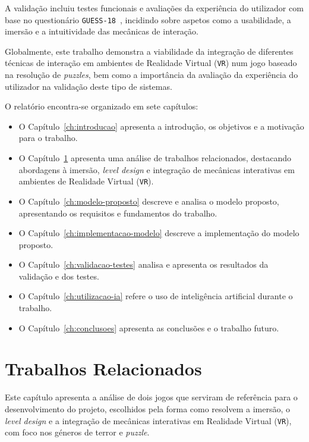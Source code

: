 \documentclass[a4paper, 12pt]{book}
\begin{document}
\par
A validação incluiu testes funcionais e avaliações da experiência do utilizador com base 
no questionário \texttt{GUESS-18}~\cite{guess18}, incidindo sobre aspetos como a usabilidade, 
a imersão e a intuitividade das mecânicas de interação.

\par
Globalmente, este trabalho demonstra a viabilidade da integração de diferentes técnicas 
de interação em ambientes de Realidade Virtual (\texttt{VR}) num jogo baseado na resolução de 
\textit{puzzles}, bem como a importância da avaliação da experiência do utilizador na 
validação deste tipo de sistemas.
\par
O relatório encontra-se organizado em sete capítulos:
\begin{itemize}
\item O Capítulo~\ref{ch:introducao} apresenta a introdução, os objetivos e a motivação para o trabalho.
\item O Capítulo~\ref{ch:trab-relacionados} apresenta uma análise de trabalhos relacionados, destacando abordagens à imersão, \textit{level design} e integração de mecânicas interativas em ambientes de Realidade Virtual (\texttt{VR}).
\item O Capítulo~\ref{ch:modelo-proposto} descreve e analisa o modelo proposto, apresentando os requisitos e fundamentos do trabalho.
\item O Capítulo~\ref{ch:implementacao-modelo} descreve a implementação do modelo proposto.
\item O Capítulo~\ref{ch:validacao-testes} analisa e apresenta os resultados da validação e dos testes.
\item O Capítulo~\ref{ch:utilizacao-ia} refere o uso de inteligência artificial durante o trabalho.
\item O Capítulo~\ref{ch:conclusoes} apresenta as conclusões e o trabalho futuro.
\end{itemize}


\chapter{Trabalhos Relacionados} 
\label{ch:trab-relacionados}

Este capítulo apresenta a análise de dois jogos que serviram de referência para 
o desenvolvimento do projeto, escolhidos pela forma como resolvem a imersão, o 
\textit{level design} e a integração de mecânicas interativas em Realidade Virtual (\texttt{VR}), 
com foco nos géneros de terror e \textit{puzzle}.
\end{document}

